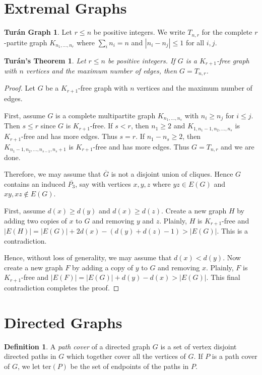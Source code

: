 \documentclass[12pt]{article}
\theoremstyle{plain}
\newtheorem*{Turan}{Tur{\'a}n's Theorem}
\theoremstyle{definition}
\newtheorem{defn}{Definition}[section]
\newtheorem*{TuranGraph}{Tur{\'a}n Graph}
\theoremstyle{remark}
\newcommand{\card}[1]{\left|#1\right|}
\begin{document}
\section{Extremal Graphs}
\begin{TuranGraph}
Let $r \leq n$ be positive integers.  We write $T_{n, r}$ for the complete $r$-partite graph $K_{n_1, \ldots, n_r}$ where $\sum_i n_i = n$ and $|n_i - n_j| \leq 1$ for all $i, j$.  
\end{TuranGraph}

\begin{Turan}
Let $r \leq n$ be positive integers.  If $G$ is a $K_{r+1}$-free graph with $n$ vertices and the maximum number of edges, then $G = T_{n, r}$.
\end{Turan}
\begin{proof}
Let $G$ be a $K_{r+1}$-free graph with $n$ vertices and the maximum number of edges.

First, assume $G$ is a complete multipartite graph $K_{n_1, \ldots, n_s}$ with $n_i \geq n_j$ for $i \leq j$.  Then $s \leq r$ since $G$ is $K_{r+1}$-free.  If $s < r$, then $n_1 \geq 2$ and $K_{1, n_1 - 1, n_2, \ldots, n_s}$ is $K_{r+1}$-free and has more edges.  Thus $s = r$.  If $n_1 - n_s \geq 2$, then $K_{n_1 - 1, n_2, \ldots, n_{s-1}, n_s + 1}$ is $K_{r+1}$-free and has more edges.  Thus $G = T_{n, r}$ and we are done.

Therefore, we may assume that $\overline{G}$ is not a disjoint union of cliques. Hence $G$ contains an induced $\overline{P_3}$, say with vertices $x, y, z$ where $yz \in E(G)$ and $xy, xz \not \in E(G)$.

First, assume $d(x) \geq d(y)$ and $d(x) \geq d(z)$.  Create a new graph $H$ by adding two copies of $x$ to $G$ and removing $y$ and $z$.  Plainly, $H$ is $K_{r+1}$-free and $\card{E(H)} = \card{E(G)} + 2d(x) - (d(y) + d(z) - 1) > \card{E(G)}$.  This is a contradiction.

Hence, without loss of generality, we may assume that $d(x) < d(y)$.  Now create a new graph $F$ by adding a copy of $y$ to $G$ and removing $x$.  Plainly, $F$ is $K_{r+1}$-free and $\card{E(F)} = \card{E(G)} + d(y) - d(x) > \card{E(G)}$.  This final contradiction completes the proof.
\end{proof}

\section{Directed Graphs}
\begin{defn}
A \emph{path cover} of a directed graph $G$ is a set of vertex disjoint directed paths in $G$ which together cover all the vertices of $G$.  If $P$ is a path cover of $G$, we let ter$(P)$ be the set of endpoints of the paths in $P$.
\end{defn}
\end{document}
